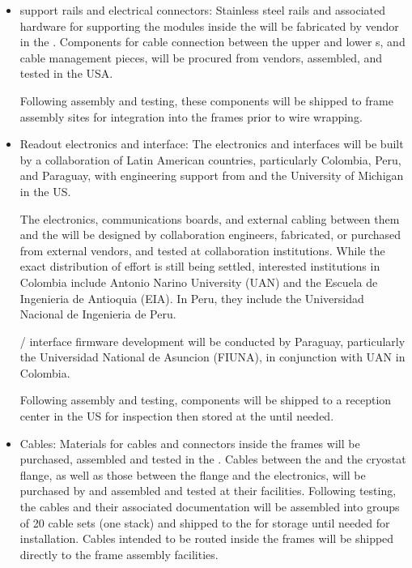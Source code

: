 \begin{itemize}
\item {} support rails and electrical connectors:  Stainless steel rails and associated hardware for supporting the  modules inside the  will be fabricated by vendor in the .  Components for cable connection between the upper and lower s, and cable management pieces, will be procured from vendors, assembled, and tested in the USA.  

Following assembly and testing, these components will be shipped to  frame assembly sites for integration into the frames prior to wire wrapping.

\item Readout electronics and  interface:  The  electronics and  interfaces will be built by a collaboration of Latin American countries, particularly Colombia, Peru, and Paraguay, with engineering support from  and the University of Michigan in the US. 

The  electronics, communications boards, and external cabling between them and the  will be designed by collaboration engineers, fabricated, or purchased from external vendors, and tested at collaboration institutions.  While the exact distribution of effort is still being settled, interested institutions in Colombia include Antonio Narino University (UAN) and the Escuela de Ingenieria de Antioquia (EIA).  In Peru, they include the Universidad Nacional de Ingenieria de Peru.

/ interface firmware development will be conducted by Paraguay, particularly the Universidad National de Asuncion (FIUNA), in conjunction with UAN in Colombia.

Following assembly and testing, components will be shipped to a reception center in the US for inspection then stored at the  until needed.

\item Cables:  Materials for cables and connectors inside the  frames will be purchased, assembled and tested in the .  Cables between the  and the cryostat flange, as well as those between the flange and the  electronics, will be purchased by  and assembled and tested at their facilities.
Following testing, the cables and their associated  documentation will be assembled into groups of 20 cable sets (one  stack) and shipped to the  for storage until needed for installation.  Cables intended to be routed inside the  frames will be shipped directly to the  frame assembly facilities.


\end{itemize}
